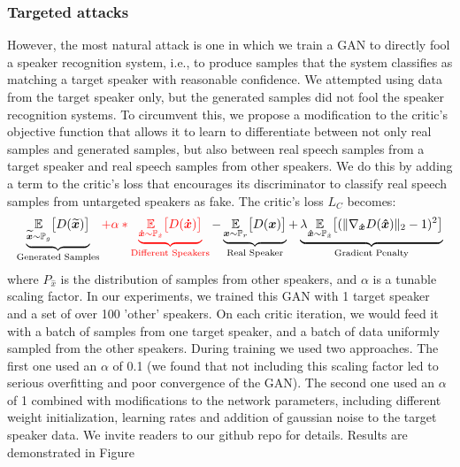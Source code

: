 \subsubsection{Targeted attacks}
\label{sub:targeted}
However, the most natural attack is one in which we train a GAN to directly fool
a speaker recognition system, i.e., to produce samples that the system
classifies as matching a target speaker with reasonable confidence. We attempted
using data from the target speaker only, but the generated samples did not fool
the speaker recognition systems. To circumvent this, we propose a 
modification to the critic's objective function that allows it to learn to 
differentiate between not only real samples and generated samples, but also between real speech samples from a target 
speaker and real speech samples from other speakers. We do this by adding a term 
to the critic's loss that encourages its discriminator to classify real speech 
samples from untargeted speakers as fake. The critic's loss $L_C$ becomes:
\begin{align}
    \underbrace{\underset{\boldsymbol{\widetilde{x}} \sim \mathbb{P}_{g}}{\mathbb{E}}  \big[D(\boldsymbol{\widetilde{x}})\big]}_\text{Generated Samples} \color{red} + \alpha * \underbrace{\underset{\boldsymbol{\dot{x}} \sim \mathbb{P}_{\dot{x}}}{\mathbb{E}}  \big[D(\boldsymbol{\dot{x}})\big]}_\text{Different Speakers} \color{black} - \underbrace{\underset{\boldsymbol{x} \sim \mathbb{P}_{r}}{\mathbb{E}}  \big[D(\boldsymbol{x})\big]}_\text{Real Speaker}  + \underbrace{\lambda \underset{\boldsymbol{\hat{x}} \sim \mathbb{P}_{\hat{x}}}{\mathbb{E}}  \big[(\lVert \nabla_{\boldsymbol{\hat{x}}} D(\boldsymbol{\hat{x}}) \rVert_2 - 1)^2\big]}_\text{Gradient Penalty}
\end{align}
where $P_{\hat{x}}$ is the distribution of samples from other speakers, and
$\alpha$ is a tunable scaling factor. In our experiments, we trained this GAN
with 1 target speaker and a set of over 100 'other' speakers. On each critic
iteration, we would feed it with a batch of samples from one target speaker, 
and a batch of data uniformly sampled from the other speakers. During training 
we used two approaches. The first one used an $\alpha$ of 0.1 (we found that not 
including this scaling factor led to serious overfitting and poor convergence of 
the GAN). The second one used an $\alpha$ of 1 combined with modifications to 
the network parameters, including different weight initialization, learning
rates and addition of gaussian noise to the target speaker data. We invite
readers to our github repo for details. Results are demonstrated in Figure
